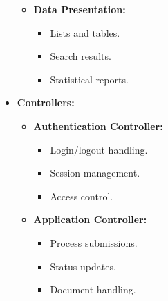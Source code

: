 \begin{itemize}
\begin{itemize}
\begin{itemize}
        \end{itemize}
        \item \textbf{Data Presentation:}
        \begin{itemize}
            \item Lists and tables.
            \item Search results.
            \item Statistical reports.
        \end{itemize}
    \end{itemize}
    \item \textbf{Controllers:}
    \begin{itemize}
        \item \textbf{Authentication Controller:}
        \begin{itemize}
            \item Login/logout handling.
            \item Session management.
            \item Access control.
        \end{itemize}
        \item \textbf{Application Controller:}
        \begin{itemize}
            \item Process submissions.
            \item Status updates.
            \item Document handling.
        \end{itemize}
    \end{itemize}
\end{itemize}

